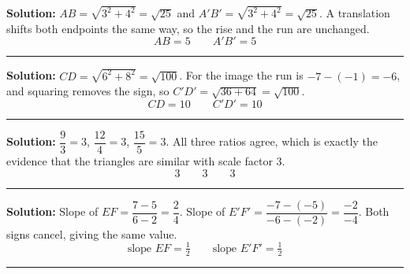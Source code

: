 \documentclass[12pt]{article}
\begin{document}



\textbf{Solution:} \quad $AB = \sqrt{3^2 + 4^2} = \sqrt{25}$ and
$A'B' = \sqrt{3^2 + 4^2} = \sqrt{25}$. A translation shifts both endpoints the same way, so the
rise and the run are unchanged.
\[ \boxed{AB = 5 \qquad A'B' = 5} \]

\vspace{0.2cm}

\noindent\rule{\linewidth}{0.2pt}


\textbf{Solution:} \quad $CD = \sqrt{6^2 + 8^2} = \sqrt{100}$. For the image the run is
$-7 - (-1) = -6$, and squaring removes the sign, so $C'D' = \sqrt{36 + 64} = \sqrt{100}$.
\[ \boxed{CD = 10 \qquad C'D' = 10} \]

\vspace{0.2cm}

\noindent\rule{\linewidth}{0.2pt}


\textbf{Solution:} \quad $\dfrac{9}{3} = 3$, \quad $\dfrac{12}{4} = 3$, \quad
$\dfrac{15}{5} = 3$. All three ratios agree, which is exactly the evidence that the triangles
are similar with scale factor $3$.
\[ \boxed{3 \qquad 3 \qquad 3} \]

\vspace{0.2cm}

\noindent\rule{\linewidth}{0.2pt}


\textbf{Solution:} \quad Slope of $EF = \dfrac{7-5}{6-2} = \dfrac{2}{4}$. Slope of
$E'F' = \dfrac{-7-(-5)}{-6-(-2)} = \dfrac{-2}{-4}$. Both signs cancel, giving the same value.
\[ \boxed{\text{slope } EF = \tfrac{1}{2} \qquad \text{slope } E'F' = \tfrac{1}{2}} \]

\vspace{0.2cm}

\noindent\rule{\linewidth}{0.2pt}

\end{document}
